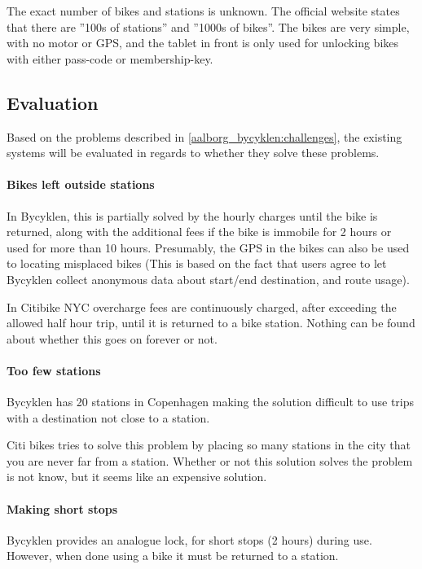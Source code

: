 The exact number of bikes and stations is unknown.
The official website states that there are ''100s of stations'' and ''1000s of bikes''\cite{nyc_citibike}.
The bikes are very simple, with no motor or GPS, and the tablet in front is only used for unlocking bikes with either pass-code or membership-key.

\subsection{Evaluation}
Based on the problems described in \cref{aalborg_bycyklen:challenges}, the existing systems will be evaluated in regards to whether they solve these problems.

\paragraph{Bikes left outside stations}
In Bycyklen, this is partially solved by the hourly charges until the bike is returned, along with the additional fees if the bike is immobile for 2 hours or used for more than 10 hours.
Presumably, the GPS in the bikes can also be used to locating misplaced bikes (This is based on the fact that users agree to let Bycyklen collect anonymous data about start/end destination, and route usage).

In Citibike NYC overcharge fees are continuously charged, after exceeding the allowed half hour trip, until it is returned to a bike station.
Nothing can be found about whether this goes on forever or not.

\paragraph{Too few stations}
Bycyklen has 20 stations in Copenhagen making the solution difficult to use trips with a destination not close to a station. 

Citi bikes tries to solve this problem by placing so many stations in the city that you are never far from a station.
Whether or not this solution solves the problem is not know, but it seems like an expensive solution.

\paragraph{Making short stops}
Bycyklen provides an analogue lock, for short stops (2 hours) during use.
However, when done using a bike it must be returned to a station.

